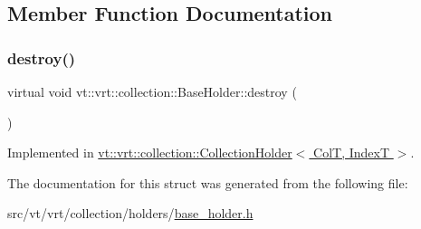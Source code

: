 \subsection{Member Function Documentation}
\mbox{\label{structvt_1_1vrt_1_1collection_1_1_base_holder_a56c8289f60121e38f3699bcfafbbd491}} 
\subsubsection{\texorpdfstring{destroy()}{destroy()}}
{\footnotesize\ttfamily virtual void vt\+::vrt\+::collection\+::\+Base\+Holder\+::destroy (\begin{DoxyParamCaption}{ }\end{DoxyParamCaption})\hspace{0.3cm}{\ttfamily [pure virtual]}}



Implemented in \hyperlink{structvt_1_1vrt_1_1collection_1_1_collection_holder_a744d2a48f9f22db59b2705b3d3f3d1ca}{vt\+::vrt\+::collection\+::\+Collection\+Holder$<$ Col\+T, Index\+T $>$}.



The documentation for this struct was generated from the following file\+:\begin{DoxyCompactItemize}
\item 
src/vt/vrt/collection/holders/\hyperlink{base__holder_8h}{base\+\_\+holder.\+h}\end{DoxyCompactItemize}
